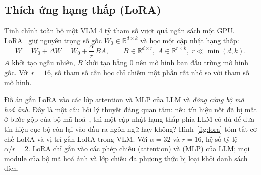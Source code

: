 \subsection{Thích ứng hạng thấp (LoRA)}

Tinh chỉnh toàn bộ một VLM 4 tỷ tham số vượt quá ngân sách một GPU. LoRA~\cite{hu2022lora} giữ nguyên trọng số
gốc $W_0 \in \mathbb{R}^{d\times k}$ và học một cập nhật hạng thấp:
\begin{equation}
  W = W_0 + \Delta W = W_0 + \frac{\alpha}{r}\, B A, \qquad B \in \mathbb{R}^{d\times r},\; A \in \mathbb{R}^{r\times k},\; r \ll \min(d,k).
\end{equation}
$A$ khởi tạo ngẫu nhiên, $B$ khởi tạo bằng 0 nên mô hình ban đầu trùng mô hình gốc. Với $r = 16$, số tham số
cần học chỉ chiếm một phần rất nhỏ so với tham số mô hình.

Đồ án gắn LoRA vào các lớp attention và MLP của LLM và \emph{đông cứng bộ mã hoá ảnh}. Đây là một câu hỏi lý
thuyết đáng quan tâm: nếu tín hiệu nốt đã bị mất ở bước gộp của bộ mã hoá~\cite{muthyala2026frozen}, thì một
cập nhật hạng thấp phía LLM có đủ để đưa tín hiệu cục bộ còn lại vào đầu ra ngôn ngữ hay không?
Hình~\ref{fig:lora} tóm tắt cơ chế LoRA và vị trí gắn LoRA trong VLM. Với $\alpha = 32$ và $r = 16$, hệ số tỷ lệ
$\alpha/r = 2$. LoRA chỉ gắn vào các phép chiếu  (attention) và  (MLP)
của LLM; mọi module của bộ mã hoá ảnh và lớp chiếu đa phương thức bị loại khỏi danh sách đích.

